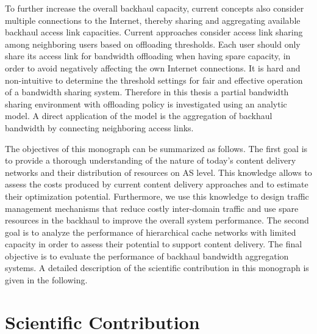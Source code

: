 To further increase the overall backhaul capacity, current concepts also consider multiple connections to the Internet, thereby sharing and aggregating available backhaul access link capacities.
Current approaches consider access link sharing among neighboring users based on offloading thresholds.
Each user should only share its access link for bandwidth offloading when having spare capacity, in order to avoid negatively affecting the own Internet connections.
It is hard and non-intuitive to determine the threshold settings for fair and effective operation of a bandwidth sharing system.
Therefore in this thesis a partial bandwidth sharing environment with offloading policy is investigated using an analytic model.
A direct application of the model is the aggregation of backhaul bandwidth by connecting neighboring access links.

The objectives of this monograph can be summarized as follows.
The first goal is to provide a thorough understanding of the nature of today's content delivery networks and their distribution of resources on AS level.
This knowledge allows to assess the costs produced by current content delivery approaches and to estimate their optimization potential.
Furthermore, we use this knowledge to design traffic management mechanisms that reduce costly inter-domain traffic and use spare resources in the backhaul to improve the overall system performance.
The second goal is to analyze the performance of hierarchical cache networks with limited capacity in order to assess their potential to support content delivery.
The final objective is to evaluate the performance of backhaul bandwidth aggregation systems.%
A detailed description of the scientific contribution in this monograph is given in the following.


\newpage
\section{Scientific Contribution}\label{sec:introduction:scientific_contribution}

